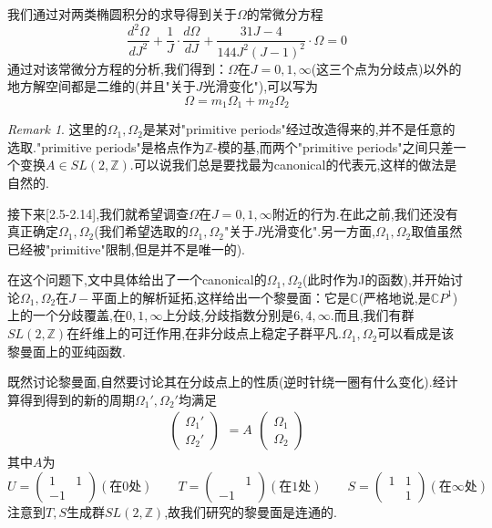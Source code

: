 \documentclass[12pt,A4paper,oneside]{amsart}
\numberwithin{equation}{section}
\theoremstyle{plain}
\theoremstyle{plain}
\theoremstyle{plain}
\numberwithin{equation}{section}
\theoremstyle{remark}
\newtheorem{remark}[theorem]{Remark}
\begin{document}
我们通过对两类椭圆积分的求导得到关于$\Omega$的常微分方程
$$\frac{d^2\Omega}{dJ^2}+\frac{1}{J}\cdot\frac{d\Omega}{dJ}+\frac{31J-4}{144J^2(J-1)^2}\cdot \Omega=0$$
通过对该常微分方程的分析,我们得到：$\Omega$在$J=0,1,\infty$(这三个点为分歧点)以外的地方解空间都是二维的(并且"关于$J$光滑变化"),可以写为
$$\Omega=m_1\Omega_1+m_2\Omega_2$$
\begin{remark}
	这里的$\Omega_1,\Omega_2$是某对"primitive periods"经过改造得来的,并不是任意的选取."primitive periods"是格点作为$\mathbb{Z}$-模的基,而两个"primitive periods"之间只差一个变换$A \in SL(2,\mathbb{Z})$.可以说我们总是要找最为canonical的代表元,这样的做法是自然的.
\end{remark}
接下来[2.5-2.14],我们就希望调查$\Omega$在$J=0,1,\infty$附近的行为.在此之前,我们还没有真正确定$\Omega_1,\Omega_2$(我们希望选取的$\Omega_1,\Omega_2$"关于$J$光滑变化".另一方面,$\Omega_1,\Omega_2$取值虽然已经被"primitive"限制,但是并不是唯一的).

在这个问题下,文中具体给出了一个canonical的$\Omega_1,\Omega_2$(此时作为J的函数),并开始讨论$\Omega_1,\Omega_2$在$J-$平面上的解析延拓,这样给出一个黎曼面：它是$\mathbb{C}$(严格地说,是$\mathbb{C}P^1$)上的一个分歧覆盖,在$0,1,\infty$上分歧,分歧指数分别是$6,4,\infty$.而且,我们有群$SL(2,\mathbb{Z})$在纤维上的可迁作用,在非分歧点上稳定子群平凡.$\Omega_1,\Omega_2$可以看成是该黎曼面上的亚纯函数.

既然讨论黎曼面,自然要讨论其在分歧点上的性质(逆时针绕一圈有什么变化).经计算得到得到的新的周期$\Omega_1',\Omega_2'$均满足
\begin{equation*}
\begin{aligned}
\begin{pmatrix}
\Omega_1'\\\Omega_2'
\end{pmatrix}
\end{aligned}=A\begin{aligned}
\begin{pmatrix}
\Omega_1\\\Omega_2
\end{pmatrix}
\end{aligned}
\end{equation*}
其中$A$为$$U=\begin{pmatrix}
1 & 1\\
-1& 
\end{pmatrix}(\text{在$0$处})\qquad
T=\begin{pmatrix}
 & 1\\
-1& 
\end{pmatrix}(\text{在$1$处})\qquad
S=\begin{pmatrix}
1 & 1\\
 & 1
\end{pmatrix}(\text{在$\infty$处})$$
注意到$T,S$生成群$SL(2,\mathbb{Z})$,故我们研究的黎曼面是连通的.
\end{document}

